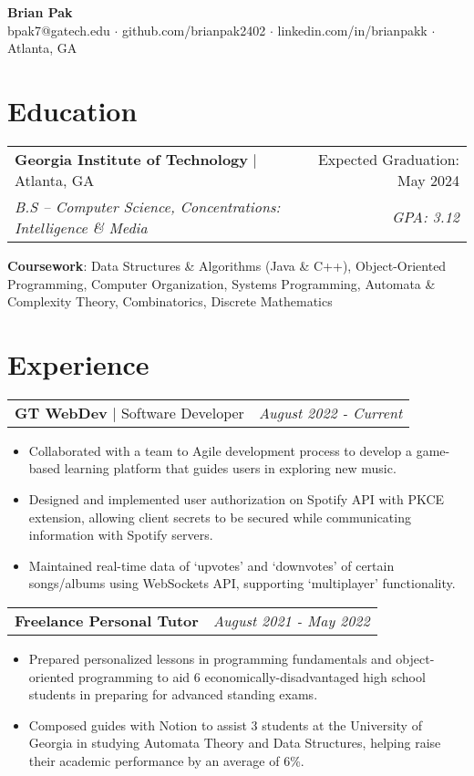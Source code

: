 \documentclass[letterpaper,11pt]{article}
\makeatletter
\newcommand{\resumeEducationHeading}[5]{
    \begin{tabular*}{0.99\textwidth}[t]{l@{\extracolsep{\fill}}r}
      \textbf{#1} $\vert$ #2 & #3 \\
      \textit{\small#4} & \textit{\small #5} \\
    \end{tabular*}\vspace{0.5pt}
}
\newcommand{\resumeExperienceHeading}[3]{
    \begin{tabular*}{0.99\textwidth}[t]{l@{\extracolsep{\fill}}r}
      \textbf{#1} {#2} & \textit{#3} \\
    \end{tabular*}\vspace{-3pt}
}
\newcommand{\resumeItemListStart}{\begin{itemize}[noitemsep]\vspace{-4pt}}
\newcommand{\resumeItemListEnd}{\end{itemize}}
\makeatother
\begin{document}
\begin{center}
  \textbf{\huge Brian Pak} \\
  \vspace*{0.1cm}
  {bpak7@gatech.edu}  $\cdot$ {github.com/brianpak2402} $\cdot$ {linkedin.com/in/brianpakk}  $\cdot$ Atlanta, GA
\end{center}

\section{Education}
    \resumeEducationHeading
      {Georgia Institute of Technology}{Atlanta, GA}{Expected Graduation: May 2024}
      {B.S -- Computer Science, Concentrations: Intelligence \& Media}{GPA: 3.12\vspace{0.1cm}} 
    \textbf{Coursework}{: Data Structures \& Algorithms (Java \& C++), Object-Oriented Programming, Computer Organization, Systems Programming, Automata \& Complexity Theory, Combinatorics, Discrete Mathematics} \\

\section{Experience}
  \resumeExperienceHeading{GT WebDev}{$\vert$ Software Developer}{August 2022 - Current}
    \resumeItemListStart
      \item {Collaborated with a team to Agile development process to develop a game-based learning platform that guides users in exploring new music.}
      \item {Designed and implemented user authorization on Spotify API with PKCE extension, allowing client secrets to be secured while communicating information with Spotify servers.}
      \item {Maintained real-time data of `upvotes' and `downvotes' of certain songs/albums using WebSockets API, supporting `multiplayer' functionality.}
    \resumeItemListEnd
  
  \resumeExperienceHeading{Freelance Personal Tutor}{}{August 2021 - May 2022}
    \resumeItemListStart
      \item {Prepared personalized lessons in programming fundamentals and object-oriented programming to aid 6 economically-disadvantaged high school students in preparing for advanced standing exams.}
      \item {Composed guides with Notion to assist 3 students at the University of Georgia in studying Automata Theory and Data Structures, helping raise their academic performance by an average of 6\%.}
    \resumeItemListEnd
\end{document}
